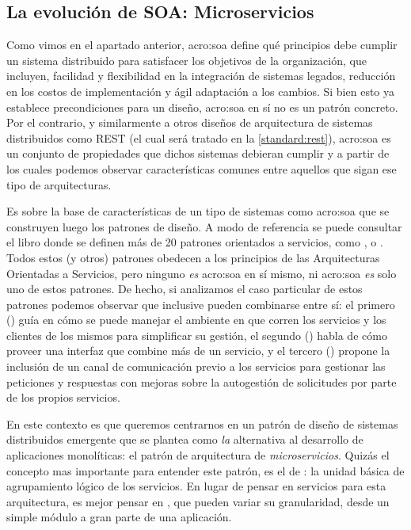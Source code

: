 \subsection{La evolución de SOA: Microservicios}
\label{microservicios}

Como vimos en el apartado anterior, \gls{acro:soa} define qué principios debe cumplir un sistema distribuido para satisfacer los objetivos de la organización, que incluyen, facilidad y flexibilidad en la integración de sistemas legados, reducción en los costos de implementación y ágil adaptación a los cambios. Si bien esto ya establece precondiciones para un diseño, \gls{acro:soa} en sí no es un patrón concreto. Por el contrario, y similarmente a otros diseños de arquitectura de sistemas distribuidos como REST (el cual será tratado en la \autoref{standard:rest}), \gls{acro:soa} es un conjunto de propiedades que dichos sistemas debieran cumplir y a partir de los cuales podemos observar características comunes entre aquellos que sigan ese tipo de arquitecturas.

Es sobre la base de características de un tipo de sistemas como \gls{acro:soa} que se construyen luego los patrones de diseño. A modo de referencia se puede consultar el libro  donde se definen más de 20 patrones orientados a servicios, como \cite[p.~19]{soapatterns}, \cite[p.~148]{soapatterns} o \cite[p.162]{soapatterns}. Todos estos (y otros) patrones obedecen a los principios de las Arquitecturas Orientadas a Servicios, pero ninguno \textit{es} \gls{acro:soa} en sí mismo, ni \gls{acro:soa} \textit{es} solo uno de estos patrones. De hecho, si analizamos el caso particular de estos patrones podemos observar que inclusive pueden combinarse entre sí: el primero () guía en cómo se puede manejar el ambiente en que corren los servicios y los clientes de los mismos para simplificar su gestión, el segundo () habla de cómo proveer una interfaz que combine más de un servicio, y el tercero () propone la inclusión de un canal de comunicación previo a los servicios para gestionar las peticiones y respuestas con mejoras sobre la autogestión de solicitudes por parte de los propios servicios.

En este contexto es que queremos centrarnos en un patrón de diseño de sistemas distribuidos emergente que se plantea como \textit{la} alternativa al desarrollo de aplicaciones monolíticas: el patrón de arquitectura de \textit{microservicios}. Quizás el concepto mas importante para entender este patrón, es el de : la unidad básica de agrupamiento lógico de los servicios. En lugar de pensar en servicios para esta arquitectura, es mejor pensar en , que pueden variar su granularidad, desde un simple módulo a gran parte de una aplicación.


